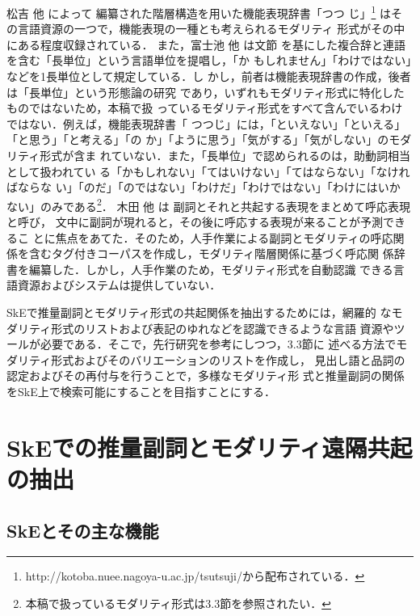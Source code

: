\documentclass[japanese]{jnlp_1.4}
\begin{document}
    松吉 他 \citeyear{Matsuyoshi}によって
編纂された階層構造を用いた機能表現辞書「つつ
じ」\footnote{
	http://kotoba.nuee.nagoya-u.ac.jp/tsutsuji/から配布されている．} 
はその言語資源の一つで，機能表現の一種とも考えられるモダリティ
形式がその中にある程度収録されている．
    また，富士池 他 \citeyear{Fujiike}は文節
を基にした複合辞と連語を含む「長単位」という言語単位を提唱し，「か
もしれません」「わけではない」などを1長単位として規定している．し
かし，前者は機能表現辞書の作成，後者は「長単位」という形態論の研究
であり，いずれもモダリティ形式に特化したものではないため，本稿で扱
っているモダリティ形式をすべて含んでいるわけではない．例えば，機能表現辞書「
つつじ」には，「といえない」「といえる」「と思う」「と考える」「の
か」「ように思う」「気がする」「気がしない」のモダリティ形式が含ま
れていない．また，「長単位」で認められるのは，助動詞相当として扱われてい
る「かもしれない」「てはいけない」「てはならない」「なければならな
い」「のだ」「のではない」「わけだ」「わけではない」「わけにはいか
ない」のみである\footnote{
	本稿で扱っているモダリティ形式は3.3節を参照されたい．}．
    木田 他 \citeyear{Kida}は
副詞とそれと共起する表現をまとめて呼応表現と呼び，
文中に副詞が現れると，その後に呼応する表現が来ることが予測できるこ
とに焦点をあてた．そのため，人手作業による副詞とモダリティの呼応関
係を含むタグ付きコーパスを作成し，モダリティ階層関係に基づく呼応関
係辞書を編纂した．しかし，人手作業のため，モダリティ形式を自動認識
できる言語資源およびシステムは提供していない．

SkEで推量副詞とモダリティ形式の共起関係を抽出するためには，網羅的
なモダリティ形式のリストおよび表記のゆれなどを認識できるような言語
資源やツールが必要である．そこで，先行研究を参考にしつつ，3.3節に
述べる方法でモダリティ形式およびそのバリエーションのリストを作成し，
見出し語と品詞の認定およびその再付与を行うことで，多様なモダリティ形
式と推量副詞の関係をSkE上で検索可能にすることを目指すことにする．



\section{SkEでの推量副詞とモダリティ遠隔共起の抽出}

\subsection{SkEとその主な機能}
\end{document}
